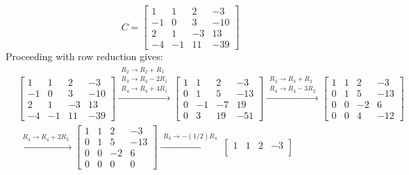 \documentclass{article}
\begin{document}
\begin{itemize}
\[C = \begin{bmatrix}
 1 &   1 &  2  &  -3 \\
-1 &   0 &  3 & -10 \\
 2 &   1 & -3 &  13 \\
-4 & -1 & 11 & -39
\end{bmatrix}\]
Proceeding with row reduction gives:
\begin{align*}
& \begin{bmatrix}
 1 &   1 &  2  &  -3 \\
-1 &   0 &  3 & -10 \\
 2 &   1 & -3 &  13 \\
-4 & -1 & 11 & -39
\end{bmatrix} \xrightarrow{\begin{array}{c} R_2 \rightarrow R_2 + R_1 \\ R_3 \rightarrow R_3 - 2R_1 \\ R_4 \rightarrow R_4 + 4R_1 \end{array}} \begin{bmatrix}
1 &  1 &   2 &  -3 \\
0 &  1 &   5 & -13 \\
0 & -1 & -7 &  19 \\
0 &  3 & 19 & -51
\end{bmatrix} \xrightarrow{\begin{array}{c} R_3 \rightarrow R_3 + R_2 \\ R_4 \rightarrow R_4 - 3R_2 \end{array}} \begin{bmatrix}
1 & 1 &   2 &   -3 \\
0 & 1 &   5 & -13 \\
0 & 0 & -2 &    6 \\
0 & 0 &  4 & -12
\end{bmatrix} \\ 
& \xrightarrow{\begin{array}{c} R_4 \rightarrow R_4 + 2R_3 \end{array}} \begin{bmatrix}
1 & 1 &   2 &   -3 \\
0 & 1 &   5 & -13 \\
0 & 0 & -2 &    6 \\
0 & 0 &   0 &    0
\end{bmatrix} \xrightarrow{\begin{array}{c} R_4 \rightarrow -(1/2)R_4 \end{array}} \begin{bmatrix}
1 & 1 & 2 &   -3 \\

\end{bmatrix}
\end{align*}
\end{itemize}
\end{document}
